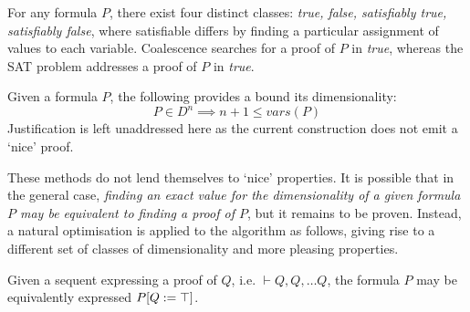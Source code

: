     \begin{remark*}
        For any formula $P$, there exist four distinct classes: \textit{true, false, satisfiably true, satisfiably false}, where satisfiable differs by finding a particular assignment of values to each variable.
        Coalescence searches for a proof of $P$ in \textit{true}, whereas the SAT problem addresses a proof of $P$ in \textit{true}.
    \end{remark*}
    
    
    \begin{proposition*}
        Given a formula $P$, the following provides a bound its dimensionality:
        \begin{equation*}
            P \in D^n \implies n+1 \leq vars(P)
        \end{equation*}
        Justification is left unaddressed here as the current construction does not emit a `nice' proof.
    \end{proposition*}

    \begin{remark*}
        These methods do not lend themselves to `nice' properties.
        It is possible that in the general case, \textit{finding an exact value for the dimensionality of a given formula $P$ may be equivalent to finding a proof of $P$}, but it remains to be proven.
        Instead, a natural optimisation is applied to the algorithm as follows, giving rise to a different set of classes of dimensionality and more pleasing properties.
    \end{remark*} 

    \begin{definition*}
         Given a sequent expressing a proof of $Q$, i.e. $\vdash Q, Q, \ldots Q$, the formula $P$ may be equivalently expressed $P[Q := \top]$.
    \end{definition*}

